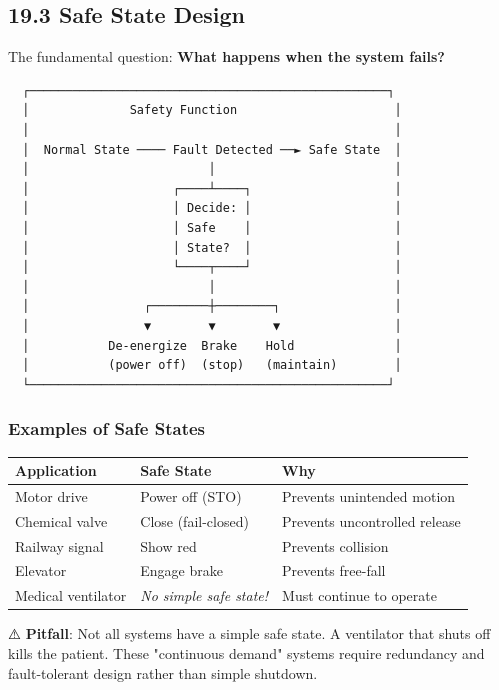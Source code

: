 \documentclass[11pt,a4paper]{book}
\begin{document}
\begin{itemize}
\medskip\noindent\hrulefill\medskip

\subsection{19.3 Safe State Design}

The fundamental question: \textbf{What happens when the system fails?}

\begin{lstlisting}
  ┌──────────────────────────────────────────────────┐
  │              Safety Function                      │
  │                                                   │
  │  Normal State ──── Fault Detected ──► Safe State  │
  │                         │                         │
  │                    ┌────┴────┐                    │
  │                    │ Decide: │                    │
  │                    │ Safe    │                    │
  │                    │ State?  │                    │
  │                    └────┬────┘                    │
  │                         │                         │
  │                ┌────────┼────────┐                │
  │                ▼        ▼        ▼                │
  │           De-energize  Brake    Hold              │
  │           (power off)  (stop)   (maintain)        │
  └──────────────────────────────────────────────────┘
\end{lstlisting}

\subsubsection{Examples of Safe States}

\begin{center}
\begin{tabular}{|l|l|l|}
\hline
Application & Safe State & Why \\
\hline
Motor drive & Power off (STO) & Prevents unintended motion \\
Chemical valve & Close (fail-closed) & Prevents uncontrolled release \\
Railway signal & Show red & Prevents collision \\
Elevator & Engage brake & Prevents free-fall \\
Medical ventilator & \textit{No simple safe state!} & Must continue to operate \\
\hline
\end{tabular}
\end{center}

⚠️ \textbf{Pitfall}: Not all systems have a simple safe state. A ventilator that shuts off kills the patient. These "continuous demand" systems require redundancy and fault-tolerant design rather than simple shutdown.


\end{itemize}
\end{document}
